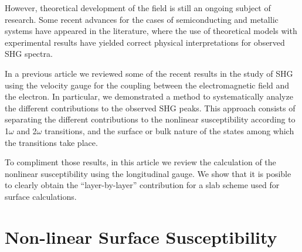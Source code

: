 \documentclass[floatfix,prb,aps,superscriptaddress,11pt,preprint,letterpaper]{revtex4}
\begin{document}
However, theoretical development of the field is still an ongoing 
subject of research. Some recent advances for the cases of semiconducting 
and metallic systems have appeared in the literature, where the use of 
theoretical models with experimental results have yielded correct 
physical interpretations for observed SHG spectra.
\cite{
downer_optical_2001,
mendoza_ab_2001,
lim_optical_2000,
gavrilenko_optical_2000,
mendoza_visible-infrared_1999,
mendoza_microscopic_1998,
mendozaPRB96,
mendoza_polarizable-bond_1997,
guyotPRB90} 

In a previous article\cite{mendoza_epioptics_2001} we reviewed some 
of the recent results in the study of SHG using the velocity gauge 
for the coupling between the electromagnetic field and the electron. 
In particular, we demonstrated a method to systematically analyze the 
different contributions to the observed SHG peaks.\cite{arzatePRB01} 
This approach consists of separating the different contributions to 
the nonlinear susceptibility according to 1$\omega$ and 2$\omega$ 
transitions, and the surface or bulk nature of the states among 
which the transitions take place. 

To compliment those results, in this article we review the calculation 
of the nonlinear susceptibility using the longitudinal gauge. We show 
that it is posible to clearly obtain the ``layer-by-layer'' contribution 
for a slab scheme used for surface calculations.

\section{Non-linear Surface Susceptibility}\label{nonchi}
\end{document}
